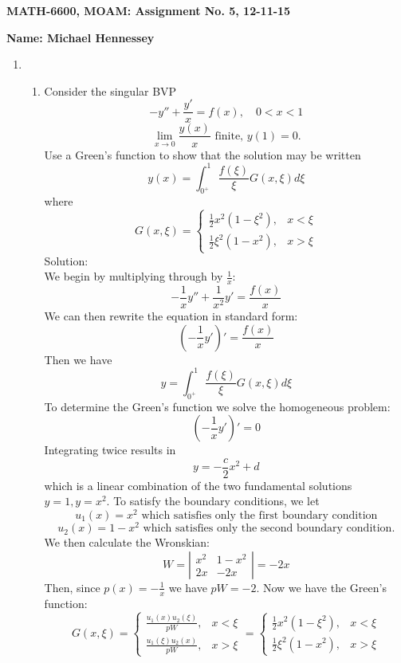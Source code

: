 \documentclass[12pt]{article}
\numberwithin{equation}{section}
\begin{document}
{\large\bf MATH-6600, MOAM: Assignment No. 5, 12-11-15}



\vspace{6 ex}

{\bf Name: Michael Hennessey} \hfill

\vspace{6 ex}

\begin{enumerate}
\item \begin{enumerate}\item
    Consider the singular BVP
    $$-y''+\frac{y'}{x}=f(x),\quad 0<x<1$$
    $$\lim_{x\to 0}\frac{y(x)}{x}\text{ finite,   }y(1)=0.$$
    Use a Green's function to show that the solution may be written
    $$y(x)=\int_{0^+}^1 \frac{f(\xi)}{\xi}G(x,\xi)d\xi$$
    where
    $$G(x,\xi)=\left\{\begin{array}{cc}\frac{1}{2}x^2(1-\xi^2),&x<\xi\\ \frac{1}{2}\xi^2(1-x^2),&x>\xi\end{array}\right.$$
    Solution:\\

    We begin by multiplying through by $\frac{1}{x}$:
    $$-\frac{1}{x}y''+\frac{1}{x^2}y'=\frac{f(x)}{x}$$
    We can then rewrite the equation in standard form:
    $$(-\frac{1}{x}y')'=\frac{f(x)}{x}$$
    Then we have
    $$y=\int_{0^+}^1\frac{f(\xi)}{\xi}G(x,\xi)d\xi$$
    To determine the Green's function we solve the homogeneous problem:
    $$(-\frac{1}{x}y')'=0$$
    Integrating twice results in
    $$y=-\frac{c}{2}x^2+d$$
    which is a linear combination of the two fundamental solutions $y=1,y=x^2$. To satisfy the boundary conditions, we let
    $$u_1(x)=x^2\text{  which satisfies only the first boundary condition}$$
    $$u_2(x)=1-x^2\text{  which satisfies only the second boundary condition}.$$
    We then calculate the Wronskian:
    $$W=\left|\begin{array}{cc}x^2&1-x^2\\2x&-2x\end{array}\right|=-2x$$
    Then, since $p(x)=-\frac{1}{x}$ we have $pW=-2$. Now we have the Green's function:
    $$G(x,\xi)=\left\{\begin{array}{cc}\frac{u_1(x)u_2(\xi)}{pW},&x<\xi\\ \frac{u_1(\xi)u_2(x)}{pW},&x>\xi\end{array}\right.=\left\{\begin{array}{cc}\frac{1}{2}x^2(1-\xi^2),&x<\xi\\ \frac{1}{2}\xi^2(1-x^2),&x>\xi\end{array}\right.$$


\end{enumerate}
\end{enumerate}
\end{document}

